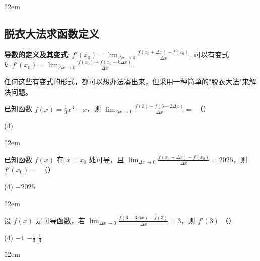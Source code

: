 \v{12em}

\subsection{脱衣大法求函数定义}

\begin{theorem}[脱衣大法]
    \textbf{导数的定义及其变式}:
    $f'(x_0) = \lim_{\Delta x \to 0}\frac{f(x_0 + \Delta x) - f(x_0)}{\Delta x}$.
    可以有变式 $k \cdot f'(x_0) = \lim_{\Delta x \to 0}\frac{f(x_0) - f(x_0 - k \Delta x)}{\Delta x}$.

    任何这些有变式的形式，都可以想办法凑出来，但采用一种简单的"脱衣大法"来解决问题。
\end{theorem}
\begin{example}
    已知函数 $f(x) = \frac{1}{3}x^{3} - x$，则 $\lim_{\Delta x \to 0}\frac{f(3) - f(3 - 2 \Delta x)}{\Delta x} =$ （\quad）
    \begin{tasks}(4)
           
    \end{tasks}
\end{example}

\v{12em}

\begin{example}
    已知函数 $f(x)$ 在 $x = x_{0}$ 处可导，且 $\lim_{\Delta x \to 0}\frac{f(x_{0} - \Delta x) - f(x_{0})}{\Delta x} = 2025$，则 $f'(x_{0}) =$ （\quad）
    \begin{tasks}(4)
        \task $- 2025$   
    \end{tasks}
\end{example}

\v{12em}

\begin{example}
    设 $f(x)$ 是可导函数，若 $\lim_{\Delta x \to 0}\frac{f(3 - 3\Delta x) - f(3)}{\Delta x} = 3$，则 $f'(3)$ （\quad）
    \begin{tasks}(4)
        \task $- 1$ \task $- \frac{1}{3}$ \task $\frac{1}{3}$ 
    \end{tasks}
\end{example}

\v{12em}
